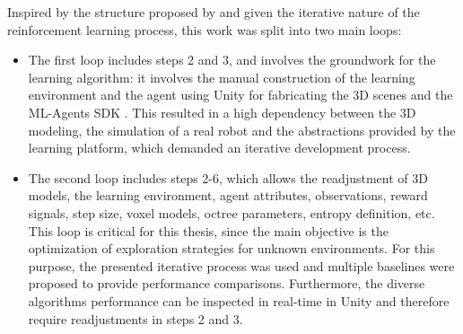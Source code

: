 Inspired by the structure proposed by \textcite{luckert2016using} and given the iterative nature of the reinforcement learning process, this work was split into two main loops:
\begin{itemize}
    \item The first loop includes steps 2 and 3, and involves the groundwork for the learning algorithm: it involves the manual construction of the learning environment and the agent using Unity \cite{unity2021} for fabricating the 3D scenes and the ML-Agents SDK \cite{github-unity-mlagents-toolkit}. This resulted in a high dependency between the 3D modeling, the simulation of a real robot and the  abstractions provided by the learning platform, which demanded an iterative development process.
    
    \item The second loop includes steps 2-6, which allows the readjustment of 3D models, the learning environment, agent attributes, observations, reward signals, step size, voxel models, octree parameters, entropy definition, etc. This loop is critical for this thesis, since the main objective is the optimization of exploration strategies for unknown environments. For this purpose, the presented iterative process was used and multiple baselines were proposed to provide performance comparisons. Furthermore, the diverse algorithms performance can be inspected in real-time in Unity and therefore require readjustments in steps 2 and 3.

\end{itemize}

%  
